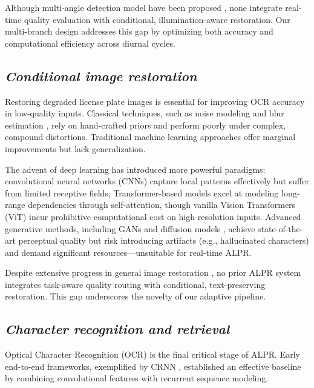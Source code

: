 \documentclass[a4paper,11pt,twocolumn]{article}
\begin{document}
	Although multi-angle detection model have been proposed \cite{TranAnh2023LicensePR}, none integrate real-time quality evaluation with conditional, illumination-aware restoration. Our multi-branch design addresses this gap by optimizing both accuracy and computational efficiency across diurnal cycles.
	
	\subsection{\textit{Conditional image restoration}}
	
	Restoring degraded license plate images is essential for improving OCR accuracy in low-quality inputs. Classical techniques, such as noise modeling and blur estimation \cite{maru2017}, rely on hand-crafted priors and perform poorly under complex, compound distortions. Traditional machine learning approaches \cite{singhal2025} offer marginal improvements but lack generalization.
	
	The advent of deep learning has introduced more powerful paradigms: convolutional neural networks (CNNs) \cite{liu2024,singhal2025} capture local patterns effectively but suffer from limited receptive fields; Transformer-based models \cite{liang2021swinir, agnolucci2022, conde2022swin2sr, singhal2025} excel at modeling long-range dependencies through self-attention, though vanilla Vision Transformers (ViT) incur prohibitive computational cost on high-resolution inputs. Advanced generative methods, including GANs and diffusion models \cite{singhal2025}, achieve state-of-the-art perceptual quality but risk introducing artifacts (e.g., hallucinated characters) and demand significant resources—unsuitable for real-time ALPR.
	
	Despite extensive progress in general image restoration \cite{singhal2025}, no prior ALPR system integrates task-aware quality routing with conditional, text-preserving restoration. This gap underscores the novelty of our adaptive pipeline.
	
	\subsection{\textit{Character recognition and retrieval}}
	\label{related_m4}
	
	Optical Character Recognition (OCR) is the final critical stage of ALPR. Early end-to-end frameworks, exemplified by CRNN \cite{Shi2015AnET}, established an effective baseline by combining convolutional features with recurrent sequence modeling.
	
\end{document}
